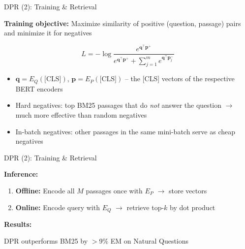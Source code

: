 \documentclass[11pt,compress,t,notes=noshow, xcolor=table]{beamer}
\begin{document}
\begin{frame}{DPR (2): Training \& Retrieval}

\vfill

\textbf{Training objective:} Maximize similarity of positive (question, passage) pairs and minimize it for negatives

\[
L = -\log \frac{e^{\mathbf{q}^{\top}\mathbf{p}^+}}{e^{\mathbf{q}^{\top}\mathbf{p}^+} + \sum_{j=1}^{m} e^{\mathbf{q}^{\top}\mathbf{p}^-_j}}
\]

\begin{itemize}
    \item $\mathbf{q} = E_Q(\text{[CLS]})$, $\mathbf{p} = E_P(\text{[CLS]})$ -- the [CLS] vectors of the respective BERT encoders
    \item Hard negatives: top BM25 passages that do \textit{not} answer the question $\rightarrow$ much more effective than random negatives
    \item In-batch negatives: other passages in the same mini-batch serve as cheap negatives
\end{itemize}

\vfill

\end{frame}

\begin{frame}{DPR (2): Training \& Retrieval}

\vfill

\textbf{Inference:}
\begin{enumerate}
    \item \textbf{Offline:} Encode all $M$ passages once with $E_P$ $\rightarrow$ store vectors
    \item \textbf{Online:} Encode query with $E_Q$ $\rightarrow$ retrieve top-$k$ by dot product
\end{enumerate}

\vfill

\textbf{Results:} 

\begin{center}
	DPR outperforms BM25 by $>$9\% EM on Natural Questions\\

\end{center}

\vfill

\end{frame}

\end{document}
